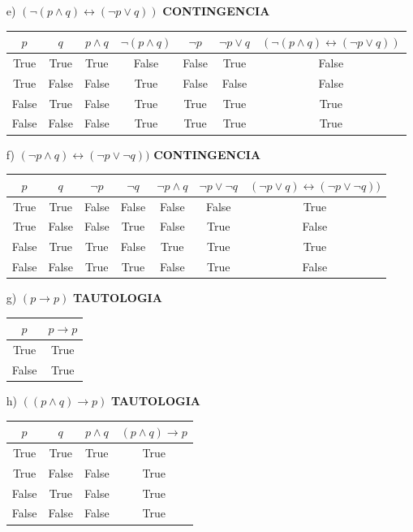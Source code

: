 \documentclass[10pt,a4paper]{article}
\begin{document}
\begin{enumerate}
\begin{tabular}{|c|c|c|c|}
\end{tabular}

\item[e)]$(\neg(p \wedge q) \leftrightarrow (\neg p \vee q))$ \textbf{CONTINGENCIA}

\begin{tabular}{|c|c|c|c|c|c|c|}
\hline
$p$ & $q$ & $p \wedge q$ & $\neg(p \wedge q)$ & $\neg p$ & $\neg p \vee q$ &  $(\neg(p \wedge q) \leftrightarrow (\neg p \vee q))$\\ \hline
True  & True  & True  & False & False & True  & False \\
True  & False & False & True  & False & False & False \\
False & True  & False & True  & True  & True  & True \\
False & False & False & True  & True  & True  & True \\ \hline
\end{tabular}

\item[f)]$(\neg p \wedge q) \leftrightarrow (\neg p \vee \neg q))$ \textbf{CONTINGENCIA}

\begin{tabular}{|c|c|c|c|c|c|c|}
\hline
$p$ & $q$ & $\neg p$ & $\neg q$ & $\neg p \wedge q$ & $\neg p \vee \neg q$ &  $(\neg p \vee q) \leftrightarrow (\neg p \vee \neg q))$\\ \hline
True  & True  & False & False & False & False & True \\
True  & False & False & True  & False & True  & False \\
False & True  & True  & False & True  & True  & True \\
False & False & True  & True  & False & True  & False \\ \hline
\end{tabular}

\item[g)]$(p \rightarrow p)$ \textbf{TAUTOLOGIA}

\begin{tabular}{|c|c|}
\hline
$p$ & $p \rightarrow p$ \\ \hline
True  & True \\
False & True \\ \hline
\end{tabular}


\item[h)]$((p \wedge q) \rightarrow p)$ \textbf{TAUTOLOGIA}

\begin{tabular}{|c|c|c|c|}
\hline
$p$ & $q$ & $p \wedge q$ & $(p \wedge q) \rightarrow p$ \\ \hline
True  & True  & True  & True \\ 
True  & False & False & True \\
False & True  & False & True \\
False & False & False & True \\ \hline
\end{tabular} 


\end{enumerate}
\end{document}
